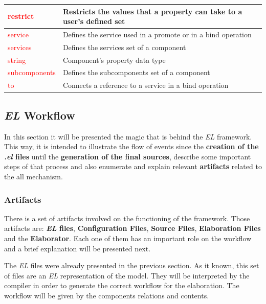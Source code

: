 \begin{table}[H]
{\begin{tabular}{|l|l|}
		\textcolor{red}{restrict}                 & Restricts the values that a property can take to a user's defined set  \\ \hline
		\textcolor{red}{service}                  & Defines the service used in a promote or in a bind operation \\ \hline
		\textcolor{red}{services}                 & Defines the services set of a component  \\ \hline
		\textcolor{red}{string}                   & Component's property data type \\ \hline
		\textcolor{red}{subcomponents}            & Defines the subcomponents set of a component  \\ \hline
		\textcolor{red}{to}                       & Connects a reference to a service in a bind operation \\ \hline
	\end{tabular} }
\end{table} 



\subsection{\textit{EL} Workflow}

In this section it will be presented the magic that is behind the \textit{EL} framework. This way, it is intended to illustrate the flow of events since the \textbf{creation of the \textit{.el} files} until the \textbf{generation of the final sources}, describe some important steps of that process and also enumerate and explain relevant \textbf{artifacts} related to the all mechanism.

\subsubsection{Artifacts}

There is a set of artifacts involved on the functioning of the framework. Those artifacts are: \textbf{\textit{EL} files}, \textbf{Configuration Files}, \textbf{Source Files}, \textbf{Elaboration Files} and the \textbf{Elaborator}. Each one of them has an important role on the workflow and a brief explanation will be presented next.


The \textit{EL} files were already presented in the previous section. As it known, this set of files are an \textit{EL} representation of the model. They will be interpreted by the compiler in order to generate the correct workflow for the elaboration. The workflow will be given by the
components relations and contents.

